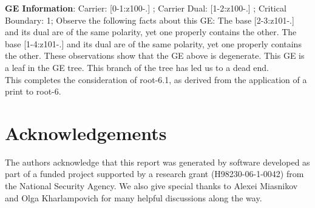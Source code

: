 \documentclass[final]{article}
\begin{document}
{\bf GE Information}:  
Carrier: [0-1:z100-.] ;  
Carrier Dual: [1-2:z100-.] ;  
Critical Boundary: 1;  
Observe the following facts about this GE:
The base [2-3:z101-.]  and its dual are of the same polarity, yet one properly contains the other.  The base [1-4:z101-.]  and its dual are of the same polarity, yet one properly contains the other.  These observations show that the GE above is degenerate.  This GE is a leaf in the GE tree.  This branch of the tree has led us to a dead end.\\[0.1in]
This completes the consideration of root-6.1, as derived from the application of a print to root-6.\\[0.1in]
\section{Acknowledgements}
The authors acknowledge that this report was generated by software developed as part of a funded project supported by a research grant (H98230-06-1-0042) from the National Security Agency.  We also give special thanks to Alexei Miasnikov and Olga Kharlampovich for many helpful discussions along the way.  
\end{document}
